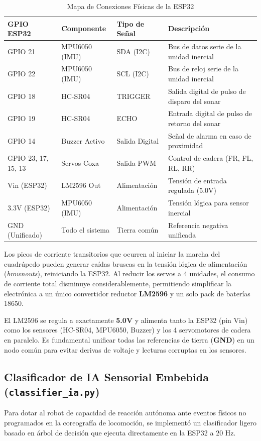 \documentclass[12pt]{article}
\newcommand{\codigo}[1]{\texttt{#1}}
\begin{document}
\begin{table}[htbp]
\centering
\caption{Mapa de Conexiones Físicas de la ESP32}
\vspace{0.3cm}
\begin{tabularx}{\textwidth}{p{2.8cm} p{2.8cm} p{2.4cm} X}
\toprule
\textbf{GPIO ESP32} & \textbf{Componente} & \textbf{Tipo de Señal} & \textbf{Descripción} \\
\midrule
GPIO 21 & MPU6050 (IMU) & SDA (I2C) & Bus de datos serie de la unidad inercial \\
GPIO 22 & MPU6050 (IMU) & SCL (I2C) & Bus de reloj serie de la unidad inercial \\
GPIO 18 & HC-SR04 & TRIGGER & Salida digital de pulso de disparo del sonar \\
GPIO 19 & HC-SR04 & ECHO & Entrada digital de pulso de retorno del sonar \\
GPIO 14 & Buzzer Activo & Salida Digital & Señal de alarma en caso de proximidad \\
GPIO 23, 17, 15, 13 & Servos Coxa & Salida PWM & Control de cadera (FR, FL, RL, RR) \\
Vin (ESP32) & LM2596 Out & Alimentación & Tensión de entrada regulada (5.0V) \\
3.3V (ESP32) & MPU6050 (IMU) & Alimentación & Tensión lógica para sensor inercial \\
GND (Unificado) & Todo el sistema & Tierra común & Referencia negativa unificada \\
\bottomrule
\end{tabularx}
\end{table}

\newpage

Los picos de corriente transitorios que ocurren al iniciar la marcha del cuadrúpedo pueden generar caídas bruscas en la tensión lógica de alimentación (\textit{brownouts}), reiniciando la ESP32. Al reducir los servos a 4 unidades, el consumo de corriente total disminuye considerablemente, permitiendo simplificar la electrónica a un único convertidor reductor \textbf{LM2596} y un solo pack de baterías 18650. 

El LM2596 se regula a exactamente \textbf{5.0V} y alimenta tanto la ESP32 (pin Vin) como los sensores (HC-SR04, MPU6050, Buzzer) y los 4 servomotores de cadera en paralelo. Es fundamental unificar todas las referencias de tierra (\textbf{GND}) en un nodo común para evitar derivas de voltaje y lecturas corruptas en los sensores.

\subsection{Clasificador de IA Sensorial Embebida (\codigo{classifier\_ia.py})}
Para dotar al robot de capacidad de reacción autónoma ante eventos físicos no programados en la coreografía de locomoción, se implementó un clasificador ligero basado en árbol de decisión que ejecuta directamente en la ESP32 a $20\text{ Hz}$.
\end{document}
